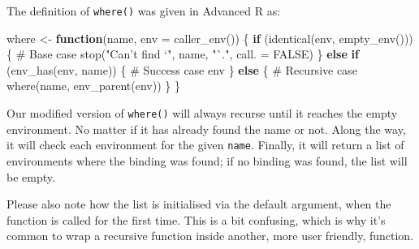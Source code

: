 \documentclass[
]{krantz}
\makeatletter
\newenvironment{Shaded}{\begin{snugshade}}{\end{snugshade}}
\newcommand{\CommentTok}[1]{\textcolor[rgb]{0.56,0.35,0.01}{\textit{#1}}}
\newcommand{\ControlFlowTok}[1]{\textcolor[rgb]{0.13,0.29,0.53}{\textbf{#1}}}
\newcommand{\DataTypeTok}[1]{\textcolor[rgb]{0.13,0.29,0.53}{#1}}
\newcommand{\KeywordTok}[1]{\textcolor[rgb]{0.13,0.29,0.53}{\textbf{#1}}}
\newcommand{\NormalTok}[1]{#1}
\newcommand{\OtherTok}[1]{\textcolor[rgb]{0.56,0.35,0.01}{#1}}
\newcommand{\StringTok}[1]{\textcolor[rgb]{0.31,0.60,0.02}{#1}}
\newenvironment{kframe}{%
\medskip{}
\setlength{\fboxsep}{.8em}
 \def\at@end@of@kframe{}%
 \ifinner\ifhmode%
  \def\at@end@of@kframe{\end{minipage}}%
  \begin{minipage}{\columnwidth}%
 \fi\fi%
 \def\FrameCommand##1{\hskip\@totalleftmargin \hskip-\fboxsep
 \colorbox{shadecolor}{##1}\hskip-\fboxsep
     \hskip-\linewidth \hskip-\@totalleftmargin \hskip\columnwidth}%
 \MakeFramed {\advance\hsize-\width
   \@totalleftmargin\z@ \linewidth\hsize
   \@setminipage}}%
 {\par\unskip\endMakeFramed%
 \at@end@of@kframe}
\renewenvironment{Shaded}{\begin{kframe}}{\end{kframe}}
\renewcommand{\KeywordTok} [1]{\textcolor[rgb]{0.00,0.44,0.13}{{#1}}}
\renewcommand{\DataTypeTok}[1]{\textcolor[rgb]{0.56,0.13,0.00}{{#1}}}
\renewcommand{\StringTok}  [1]{\textcolor[rgb]{0.25,0.44,0.63}{{#1}}}
\renewcommand{\CommentTok} [1]{\textcolor[rgb]{0.38,0.63,0.69}{{#1}}}
\renewcommand{\OtherTok}   [1]{\textcolor[rgb]{0.00,0.44,0.13}{{#1}}}
\renewcommand{\NormalTok}  [1]{{#1}}
\makeatother
\begin{document}
The definition of \texttt{where()} was given in Advanced R as:

\begin{Shaded}
\begin{Highlighting}[]
\NormalTok{where <-}\StringTok{ }\ControlFlowTok{function}\NormalTok{(name, }\DataTypeTok{env =} \KeywordTok{caller_env}\NormalTok{()) \{}
  \ControlFlowTok{if}\NormalTok{ (}\KeywordTok{identical}\NormalTok{(env, }\KeywordTok{empty_env}\NormalTok{())) \{}
    \CommentTok{# Base case}
    \KeywordTok{stop}\NormalTok{(}\StringTok{"Can't find `"}\NormalTok{, name, }\StringTok{"`."}\NormalTok{, }\DataTypeTok{call. =} \OtherTok{FALSE}\NormalTok{)}
\NormalTok{  \} }\ControlFlowTok{else} \ControlFlowTok{if}\NormalTok{ (}\KeywordTok{env_has}\NormalTok{(env, name)) \{}
    \CommentTok{# Success case}
\NormalTok{    env}
\NormalTok{  \} }\ControlFlowTok{else}\NormalTok{ \{}
    \CommentTok{# Recursive case}
    \KeywordTok{where}\NormalTok{(name, }\KeywordTok{env_parent}\NormalTok{(env))}
\NormalTok{  \}}
\NormalTok{\}}
\end{Highlighting}
\end{Shaded}

Our modified version of \texttt{where()} will always recurse until it reaches the empty environment. No matter if it has already found the name or not. Along the way, it will check each environment for the given \texttt{name}. Finally, it will return a list of environments where the binding was found; if no binding was found, the list will be empty.

Please also note how the list is initialised via the default argument, when the function is called for the first time. This is a bit confusing, which is why it's common to wrap a recursive function inside another, more user friendly, function.
\end{document}
